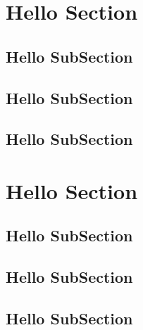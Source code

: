 \section{Hello Section}
\lipsum[3-5]
\subsection{Hello SubSection}
\lipsum[3-5]
\subsection{Hello SubSection}
\lipsum[3-5]
\subsection{Hello SubSection}
\lipsum[3-5]

\section{Hello Section}
\lipsum[3-5]
\subsection{Hello SubSection}
\lipsum[3-5]
\subsection{Hello SubSection}
\lipsum[3-5]
\subsection{Hello SubSection}
\lipsum[3-5]